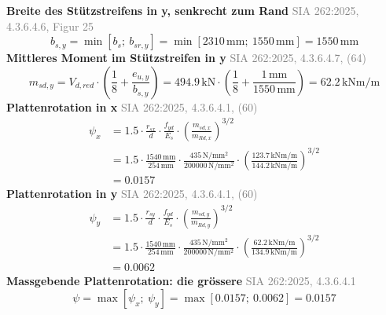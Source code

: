 \documentclass[11pt,a4paper]{article}
\newcommand{\normref}[1]{{\small\textcolor{gray}{#1}}}
\begin{document}
\noindent\textbf{Breite des Stützstreifens in y, senkrecht zum Rand} \hfill \normref{SIA 262:2025, 4.3.6.4.6, Figur 25}
\begin{equation*}
b_{s,y} = \min\left[b_s;\ b_{sr,y}\right] = \min\left[2310\,\mathrm{mm};\ 1550\,\mathrm{mm}\right] = 1550\,\mathrm{mm}
\end{equation*}
\noindent\textbf{Mittleres Moment im Stützstreifen in y} \hfill \normref{SIA 262:2025, 4.3.6.4.7, (64)}
\begin{equation*}
m_{sd,y} = V_{d,red} \cdot \left(\frac{1}{8} + \frac{e_{u,y}}{b_{s,y}}\right) = 494.9\,\mathrm{kN} \cdot \left(\frac{1}{8} + \frac{1\,\mathrm{mm}}{1550\,\mathrm{mm}}\right) = 62.2\,\mathrm{kNm}/\mathrm{m}
\end{equation*}
\noindent\textbf{Plattenrotation in x} \hfill \normref{SIA 262:2025, 4.3.6.4.1, (60)}
\begin{equation*}
\begin{aligned}
  \psi_x &= 1.5 \cdot \frac{r_{sx}}{d} \cdot \frac{f_{yd}}{E_s} \cdot \left(\frac{m_{sd,x}}{m_{Rd,x}}\right)^{3/2} \\
  &= 1.5 \cdot \frac{1540\,\mathrm{mm}}{254\,\mathrm{mm}} \cdot \frac{435\,\mathrm{N}/\mathrm{mm}^{2}}{200000\,\mathrm{N}/\mathrm{mm}^{2}} \cdot \left(\frac{123.7\,\mathrm{kNm}/\mathrm{m}}{144.2\,\mathrm{kNm}/\mathrm{m}}\right)^{3/2} \\
  &= 0.0157
\end{aligned}
\end{equation*}
\noindent\textbf{Plattenrotation in y} \hfill \normref{SIA 262:2025, 4.3.6.4.1, (60)}
\begin{equation*}
\begin{aligned}
  \psi_y &= 1.5 \cdot \frac{r_{sy}}{d} \cdot \frac{f_{yd}}{E_s} \cdot \left(\frac{m_{sd,y}}{m_{Rd,y}}\right)^{3/2} \\
  &= 1.5 \cdot \frac{1540\,\mathrm{mm}}{254\,\mathrm{mm}} \cdot \frac{435\,\mathrm{N}/\mathrm{mm}^{2}}{200000\,\mathrm{N}/\mathrm{mm}^{2}} \cdot \left(\frac{62.2\,\mathrm{kNm}/\mathrm{m}}{134.9\,\mathrm{kNm}/\mathrm{m}}\right)^{3/2} \\
  &= 0.0062
\end{aligned}
\end{equation*}
\noindent\textbf{Massgebende Plattenrotation: die grössere} \hfill \normref{SIA 262:2025, 4.3.6.4.1}
\begin{equation*}
\psi = \max\left[\psi_x;\ \psi_y\right] = \max\left[0.0157;\ 0.0062\right] = 0.0157
\end{equation*}
\end{document}
